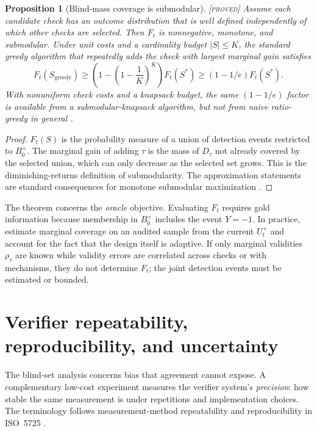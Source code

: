 \documentclass[11pt]{article}
\newtheorem{proposition}{Proposition}
\theoremstyle{definition}
\theoremstyle{remark}
\newcommand{\status}[1]{\hfill{\normalfont\small\textsc{[#1]}}}
\begin{document}
\begin{proposition}[Blind-mass coverage is submodular]\label{prop:design}\status{proved}
Assume each candidate check has an outcome distribution that is well defined independently of which other checks are selected. Then $F_t$ is nonnegative, monotone, and submodular. Under unit costs and a cardinality budget $|S|\le K$, the standard greedy algorithm that repeatedly adds the check with largest marginal gain satisfies
\[
F_t(S_{\mathrm{greedy}})\ge \left(1-\left(1-\frac1K\right)^K\right)F_t(S^*)\ge(1-1/e)F_t(S^*).
\]
With nonuniform check costs and a knapsack budget, the same $(1-1/e)$ factor is available from a submodular-knapsack algorithm, but not from naive ratio-greedy in general \cite{nemhauser1978,sviridenko2004}.
\end{proposition}
\begin{proof}
$F_t(S)$ is the probability measure of a union of detection events restricted to $B_0^+$. The marginal gain of adding $\tau$ is the mass of $D_\tau$ not already covered by the selected union, which can only decrease as the selected set grows. This is the diminishing-returns definition of submodularity. The approximation statements are standard consequences for monotone submodular maximization \cite{nemhauser1978,sviridenko2004}.
\end{proof}

The theorem concerns the \emph{oracle} objective. Evaluating $F_t$ requires gold information because membership in $B_0^+$ includes the event $Y=-1$. In practice, estimate marginal coverage on an audited sample from the current $U_t^+$ and account for the fact that the design itself is adaptive. If only marginal validities $\rho_\tau$ are known while validity errors are correlated across checks or with mechanisms, they do not determine $F_t$; the joint detection events must be estimated or bounded.

\section{Verifier repeatability, reproducibility, and uncertainty}\label{sec:rr}

The blind-set analysis concerns bias that agreement cannot expose. A complementary low-cost experiment measures the verifier system's \emph{precision}: how stable the same measurement is under repetitions and implementation choices. The terminology follows measurement-method repeatability and reproducibility in ISO~5725 \cite{iso5725}.
\end{document}
